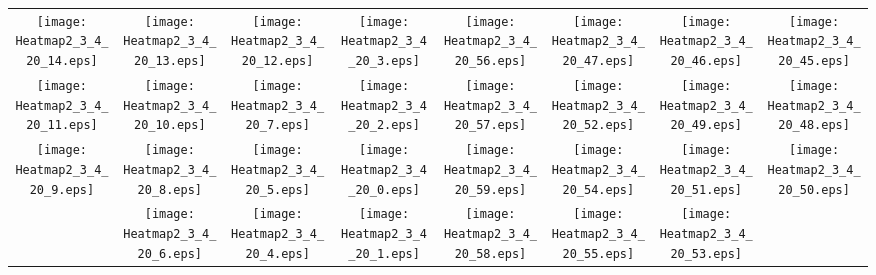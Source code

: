 \documentclass{standalone}
\begin{document}
\begin{tabular}{ *8{c} }
\texttt{[image: Heatmap2\_3\_4\_20\_14.eps]} & \texttt{[image: Heatmap2\_3\_4\_20\_13.eps]} & \texttt{[image: Heatmap2\_3\_4\_20\_12.eps]} & \texttt{[image: Heatmap2\_3\_4\_20\_3.eps]} & \texttt{[image: Heatmap2\_3\_4\_20\_56.eps]} & \texttt{[image: Heatmap2\_3\_4\_20\_47.eps]} & \texttt{[image: Heatmap2\_3\_4\_20\_46.eps]} & \texttt{[image: Heatmap2\_3\_4\_20\_45.eps]} \\
\texttt{[image: Heatmap2\_3\_4\_20\_11.eps]} & \texttt{[image: Heatmap2\_3\_4\_20\_10.eps]} & \texttt{[image: Heatmap2\_3\_4\_20\_7.eps]} & \texttt{[image: Heatmap2\_3\_4\_20\_2.eps]} & \texttt{[image: Heatmap2\_3\_4\_20\_57.eps]} & \texttt{[image: Heatmap2\_3\_4\_20\_52.eps]} & \texttt{[image: Heatmap2\_3\_4\_20\_49.eps]} & \texttt{[image: Heatmap2\_3\_4\_20\_48.eps]} \\
\texttt{[image: Heatmap2\_3\_4\_20\_9.eps]} & \texttt{[image: Heatmap2\_3\_4\_20\_8.eps]} & \texttt{[image: Heatmap2\_3\_4\_20\_5.eps]} & \texttt{[image: Heatmap2\_3\_4\_20\_0.eps]} & \texttt{[image: Heatmap2\_3\_4\_20\_59.eps]} & \texttt{[image: Heatmap2\_3\_4\_20\_54.eps]} & \texttt{[image: Heatmap2\_3\_4\_20\_51.eps]} & \texttt{[image: Heatmap2\_3\_4\_20\_50.eps]} \\
 & \texttt{[image: Heatmap2\_3\_4\_20\_6.eps]} & \texttt{[image: Heatmap2\_3\_4\_20\_4.eps]} & \texttt{[image: Heatmap2\_3\_4\_20\_1.eps]} & \texttt{[image: Heatmap2\_3\_4\_20\_58.eps]} & \texttt{[image: Heatmap2\_3\_4\_20\_55.eps]} & \texttt{[image: Heatmap2\_3\_4\_20\_53.eps]} &  
\end{tabular}
\end{document}
